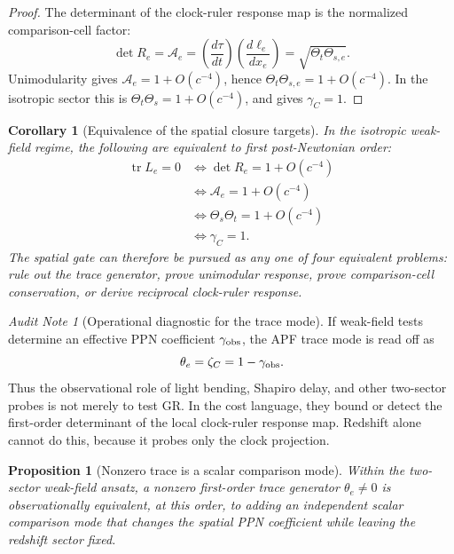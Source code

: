 \documentclass[11pt]{article}
\newtheorem{proposition}[theorem]{Proposition}
\newtheorem{corollary}[theorem]{Corollary}
\theoremstyle{remark}
\newtheorem{audit}[theorem]{Audit Note}
\begin{document}
\begin{proof}
The determinant of the clock-ruler response map is the normalized comparison-cell factor:
\[
        \det R_e=\mathcal A_e
        =\left(\frac{d\tau}{dt}\right)
         \left(\frac{d\ell_e}{dx_e}\right)
        =\sqrt{\Theta_t\Theta_{s,e}}.
\]
Unimodularity gives \(\mathcal A_e=1+O(c^{-4})\), hence \(\Theta_t\Theta_{s,e}=1+O(c^{-4})\).  In the isotropic sector this is \(\Theta_t\Theta_s=1+O(c^{-4})\), and  gives \(\gamma_C=1\).
\end{proof}

\begin{corollary}[Equivalence of the spatial closure targets]
\label{cor:spatial-target-equivalence}
In the isotropic weak-field regime, the following are equivalent to first post-Newtonian order:
\[
\begin{aligned}
        \operatorname{tr}L_e=0
        &\Longleftrightarrow
        \det R_e=1+O(c^{-4}) \\
        &\Longleftrightarrow
        \mathcal A_e=1+O(c^{-4}) \\
        &\Longleftrightarrow
        \Theta_s\Theta_t=1+O(c^{-4}) \\
        &\Longleftrightarrow
        \gamma_C=1.
\end{aligned}
\]
The spatial gate can therefore be pursued as any one of four equivalent problems: rule out the trace generator, prove unimodular response, prove comparison-cell conservation, or derive reciprocal clock-ruler response.
\end{corollary}

\begin{audit}[Operational diagnostic for the trace mode]
If weak-field tests determine an effective PPN coefficient \(\gamma_{\rm obs}\), the APF trace mode is read off as
\[
        \theta_e=\zeta_C=1-\gamma_{\rm obs}.
\]
Thus the observational role of light bending, Shapiro delay, and other two-sector probes is not merely to test GR.  In the cost language, they bound or detect the first-order determinant of the local clock-ruler response map.  Redshift alone cannot do this, because it probes only the clock projection.
\end{audit}

\begin{proposition}[Nonzero trace is a scalar comparison mode]
\label{prop:nonzero-trace-scalar-mode}
Within the two-sector weak-field ansatz, a nonzero first-order trace generator \(\theta_e\neq0\) is observationally equivalent, at this order, to adding an independent scalar comparison mode that changes the spatial PPN coefficient while leaving the redshift sector fixed.
\end{proposition}
\end{document}
